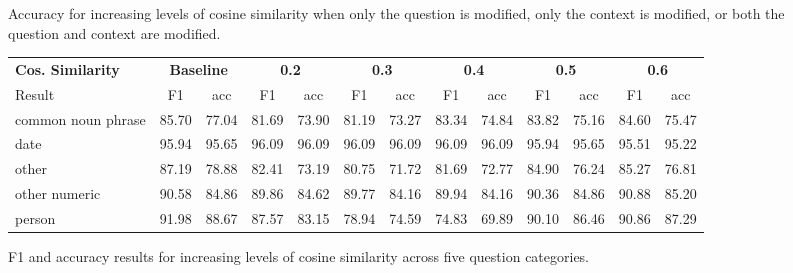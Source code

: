 \documentclass[11pt,a4paper]{article}
\begin{document}
\begin{figure}[h]
\caption{Accuracy for increasing levels of cosine similarity when only the question is modified, only the context is modified, or both the question and context are modified.}
\end{figure}

\begin{figure*}[h]
\centering
\begin{tabular}{ |m{1.35cm}|c|c|c|c|c|c|c|c|c|c|c|c| }
  \hline
  \textbf{Cos. Similarity} & \multicolumn{2}{|c|}{\textbf{Baseline}} &
  \multicolumn{2}{|c|}{\textbf{0.2}} &
  \multicolumn{2}{|c|}{\textbf{0.3}} &
  \multicolumn{2}{|c|}{\textbf{0.4}} &
  \multicolumn{2}{|c|}{\textbf{0.5}} &
  \multicolumn{2}{|c|}{\textbf{0.6}}\\
  \cline{1-13}
  Result & F1 & acc & F1 & acc & F1 & acc & F1 & acc & F1 & acc & F1 & acc \\
  \hline
  common noun phrase & 85.70 & 77.04 & 81.69 & 73.90 & 81.19 & 73.27 & 83.34 & 74.84 & 83.82 & 75.16 & 84.60 & 75.47\\
  \hline
  date & 95.94 & 95.65 & 96.09 & 96.09 & 96.09 & 96.09 & 96.09 & 96.09 & 95.94 & 95.65 & 95.51 & 95.22\\ 
  \hline
  other & 87.19 & 78.88 & 82.41 & 73.19 & 80.75	& 71.72 & 81.69 & 72.77 & 84.90 & 76.24 & 85.27 & 76.81\\
  \hline
  other numeric & 90.58 & 84.86 & 89.86 & 84.62 & 89.77 & 84.16 & 89.94 & 84.16 & 90.36 & 84.86 & 90.88 & 85.20\\
  \hline
  person & 91.98 & 88.67 & 87.57 & 83.15 & 78.94 & 74.59 & 74.83 & 69.89 & 90.10 & 86.46 & 90.86 & 87.29\\
  \hline
\end{tabular}
\caption{F1 and accuracy results for increasing levels of cosine similarity across five question categories.}
\end{figure*}
\end{document}
